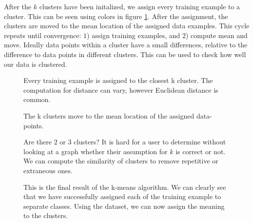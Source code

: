 \message{ !name(main.tex)}\documentclass[11pt]{article}
\begin{document}
After the $k$ clusters have been initalized, we assign every training example to a cluster. This can be seen using colors in figure \ref{fig:kmeans_assignment}. After the assignment, the clusters are moved to the mean location of the assigned data examples. This cycle repeats until convergence: $1$) assign training examples, and $2$) compute mean and move. Ideally data points within a cluster have a small differences, relative to the difference to data points in different clusters. This can be used to check how well our data is clustered. 

\begin{minipage}{0.47\linewidth}
  \begin{figure}[H]
    \centering
    
    \caption{Every training example is assigned to the closest k cluster. The computation for distance can vary, however Euclidean distance is common.}
    \label{fig:kmeans_assignment}
  \end{figure}
\end{minipage}\hfill
\begin{minipage}{0.47\linewidth}
  \begin{figure}[H]
    \centering
    
    \caption{The k clusters move to the mean location of the assigned data-points.}
    \label{fig:kmeans_move}
  \end{figure}
\end{minipage}\vspace{0.5cm}

\begin{minipage}{0.47\linewidth}
  \begin{figure}[H]
    \centering
    
    \caption{Are there $2$ or $3$ clusters? It is hard for a user to determine without looking at a graph whether their assumption for $k$ is correct or not. We can compute the similarity of clusters to remove repetitive or extraneous ones.}
    \label{fig:kmeans_2or3}
  \end{figure}
\end{minipage}\hfill
\begin{minipage}{0.47\linewidth}
  \begin{figure}[H]
    \centering
    
    \caption{This is the final result of the k-means algorithm. We can clearly see that we have successfully assigned each of the training example to separate classes. Using the dataset, we can now assign the meaning to the clusters.}
    \label{fig:kmeans_final}
  \end{figure}
\end{minipage}\vspace{0.5cm}
\end{document}
